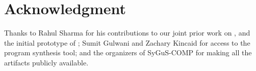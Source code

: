 \documentclass[conference]{IEEEtran}
\begin{document}
\section*{Acknowledgment}

\noindent
Thanks to Rahul Sharma for his contributions to our joint prior work on \PIE, and the initial prototype of \LoopInvGen;
Sumit Gulwani and Zachary Kincaid for access to the  program synthesis tool;
and the organizers of SyGuS-COMP for making all the artifacts publicly available.






\end{document}
